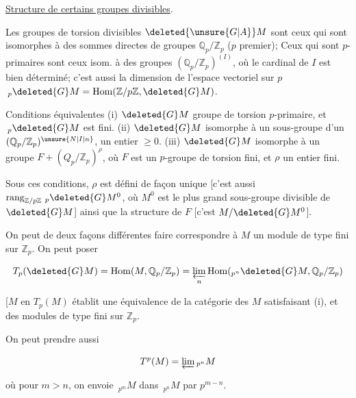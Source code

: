 \uline{Structure de certains groupes divisibles}.

 Les groupes de torsion divisibles $\deleted{\unsure{G|A}}M$ sont ceux qui sont isomorphes à des sommes directes de groupes $\mathbb{Q}_p/\mathbb{Z}_p$ ($p$ premier); Ceux qui sont $p$-primaires sont ceux isom. à des  groupes $(\mathbb{Q}_p/\mathbb{Z}_p)^{(I)}$, où le cardinal de $I$ est bien déterminé; c'est aussi la dimension de l'espace vectoriel sur $p$ $\,{}_p\deleted{G}M=\operatorname{Hom}(\mathbb{Z}/p\mathbb{Z},\deleted{G}M)$.


Conditions équivalentes (i) $\deleted{G}M$ groupe de torsion $p$-primaire, et $\,{}_p\deleted{G}M$ est fini. (ii) $\deleted{G}M$ isomorphe à un sous-groupe d'un $(\mathbb{Q}_p/\mathbb{Z}_p)^{\unsure{N|I|n}}$,  un entier $\geq0$. (iii) $\deleted{G}M$ isomorphe à un groupe $F+(Q_p/\mathbb{Z}_p)^\rho$, où $F$ est un $p$-groupe de torsion fini, et $\rho$ un entier fini.


Sous ces conditions, $\rho$ est défini de façon unique [c'est aussi $\operatorname{rang}_{\mathbb{Z}/p\mathbb{Z}}\,{}_p\deleted{G}M^0$, où $M^0$ est le plus grand sous-groupe divisible de $\deleted{G}M$] ainsi que la structure de $F$ [c'est $M/\deleted{G}M^0$].

On peut de deux façons différentes faire correspondre à $M$ un module de type fini sur $\mathbb{Z}_p$. On peut poser

\[
T_p(\deleted{G}M)=\operatorname{Hom}(M,\mathbb{Q}_p/\mathbb{Z}_p)=\underset{n}{\varprojlim}\operatorname{Hom}({}_{p^n}\deleted{G}M,\mathbb{Q}_p/\mathbb{Z}_p)
\]


[$M\text{ en }T_p(M)$ établit une équivalence de la catégorie des $M$ satisfaisant (i), et des modules de type fini sur $\mathbb{Z}_p$.

On peut prendre aussi

\[
T^p(M)=\varprojlim{}_{p^n}M
\]


où pour $m>n$, on envoie $\,{}_{p^m}M$ dans $\,{}_{p^n}M$ par $p^{m-n}$.



